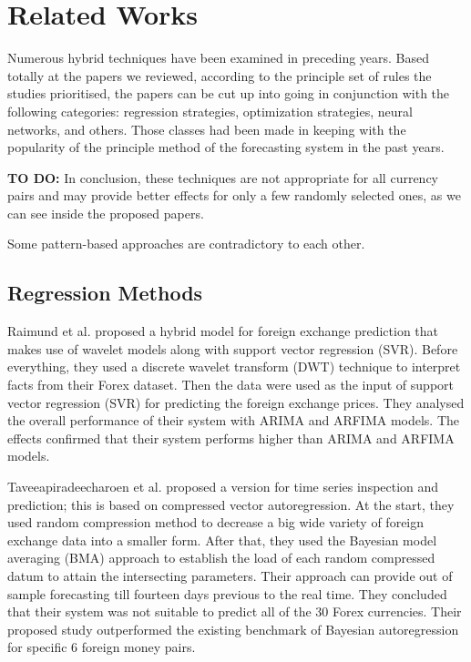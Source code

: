 \section{Related Works}

Numerous hybrid techniques have been examined in preceding years. Based totally at the papers we reviewed, according to the principle set of rules the studies prioritised, the papers can be cut up into going in conjunction with the following categories: regression strategies, optimization strategies, neural networks, and others. Those classes had been made in keeping with the popularity of the principle method of the forecasting system in the past years.

\textbf{TO DO: }
In conclusion, these techniques are not appropriate for all currency pairs and may provide better effects for only a few randomly selected ones, as we can see inside the proposed papers.

Some pattern-based approaches are contradictory to each other.

\subsection{Regression Methods}

Raimund et al. \cite{Raimundo18} proposed a hybrid model for foreign exchange prediction that makes use of wavelet models along with support vector regression (SVR). Before everything, they used a discrete wavelet transform (DWT) technique to interpret facts from their Forex dataset. Then the data were used as the input of support vector regression (SVR) for predicting the foreign exchange prices. They analysed the overall performance of their system with ARIMA and ARFIMA models. The effects confirmed that their system performs higher than ARIMA and ARFIMA models. 

Taveeapiradeecharoen et al. \citep{Taveeapiradeecharoen19} proposed a version for time series inspection and prediction; this is based on compressed vector autoregression. At the start, they used random compression method to decrease a big wide variety of foreign exchange data into a smaller form. After that, they used the Bayesian model averaging (BMA) approach to establish the load of each random compressed datum to attain the intersecting parameters. Their approach can provide out of sample forecasting till fourteen days previous to the real time. They concluded that their system was not suitable to predict all of the 30 Forex currencies. Their proposed study outperformed the existing benchmark of Bayesian autoregression for specific 6 foreign money pairs. 

